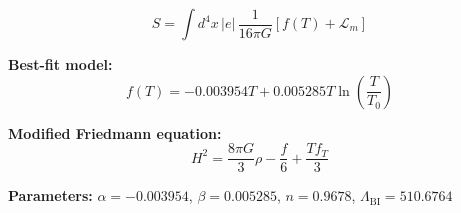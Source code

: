 
\begin{equation}
  S = \int d^4x \, |e| \, \frac{1}{16\pi G} \left[ f(T) + \mathcal{L}_m \right]
\end{equation}

\textbf{Best-fit model:}
\begin{equation}
  f(T) = -0.003954 T + 0.005285 T \ln\!\left(\frac{T}{T_0}\right)
\end{equation}

\textbf{Modified Friedmann equation:}
\begin{equation}
  H^2 = \frac{8\pi G}{3} \rho - \frac{f}{6} + \frac{T f_T}{3}
\end{equation}

\textbf{Parameters:}
$\alpha = -0.003954$, \quad
$\beta = 0.005285$, \quad
$n = 0.9678$, \quad
$\Lambda_{\text{BI}} = 510.6764$